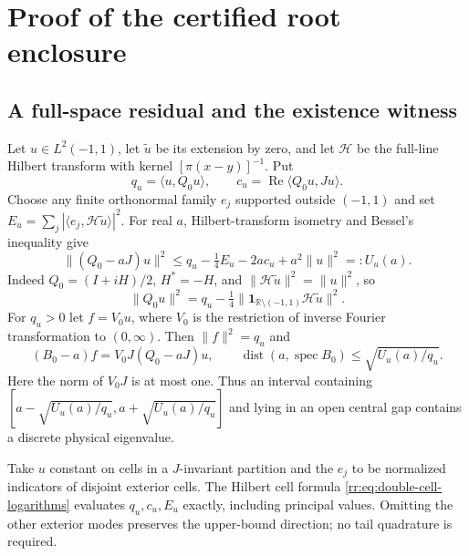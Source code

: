 \section{Proof of the certified root enclosure}
\label{boundary:app:step-parametrix:rr}

\subsection{A full-space residual and the existence witness}
\label{v12:sec:gap-certificate}

Let $u\in L^2(-1,1)$, let $\widetilde u$ be its extension by zero, and
let $\mathcal H$ be the full-line Hilbert transform with kernel
$[\pi(x-y)]^{-1}$.  Put
\[
 q_u=\langle u,Q_0u\rangle,\qquad
 c_u=\operatorname{Re}\langle Q_0u,Ju\rangle.
\]
Choose any finite orthonormal family $e_j$ supported outside $(-1,1)$
and set $E_u=\sum_j|\langle e_j,\mathcal H\widetilde u\rangle|^2$.
For real $a$, Hilbert-transform isometry and Bessel's inequality give
\begin{equation}\label{v12:eq:outside-residual-certificate}
 \|(Q_0-aJ)u\|^2
 \le q_u-\tfrac14E_u-2ac_u+a^2\|u\|^2=:U_u(a).
\end{equation}
Indeed $Q_0=(I+iH)/2$, $H^*=-H$, and
$\|\mathcal H\widetilde u\|^2=\|u\|^2$, so
\[
 \|Q_0u\|^2=q_u-\tfrac14
       \|\mathbf1_{\mathbb R\setminus(-1,1)}\mathcal H\widetilde u\|^2.
\]
For $q_u>0$ let $f=V_0u$, where $V_0$ is the restriction of inverse
Fourier transformation to $(0,\infty)$.  Then $\|f\|^2=q_u$ and
\[
 (B_0-a)f=V_0J(Q_0-aJ)u,
 \qquad
 \operatorname{dist}(a,\operatorname{spec}B_0)
       \le\sqrt{U_u(a)/q_u}.
\]
Here the norm of $V_0J$ is at most one.  Thus an interval containing
$[a-\sqrt{U_u(a)/q_u},a+\sqrt{U_u(a)/q_u}]$ and lying in an open
central gap contains a discrete physical eigenvalue.

Take $u$ constant on cells in a $J$-invariant partition and the $e_j$
to be normalized indicators of disjoint exterior cells. The Hilbert
cell formula \eqref{rr:eq:double-cell-logarithms} evaluates $q_u,c_u,E_u$
exactly, including principal values. Omitting the other exterior modes
preserves the upper-bound direction; no tail quadrature is required.

